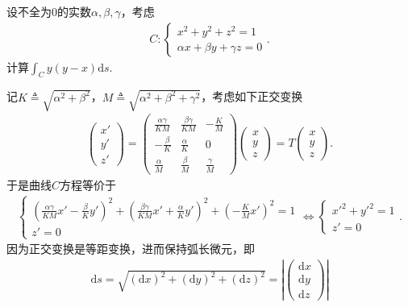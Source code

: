 \documentclass[../../main.tex]{subfiles}%
\begin{document}
\begin{example}
设不全为0的实数$\alpha,\beta,\gamma$，考虑
\begin{align*}
C:
\begin{cases}
x^2 + y^2 + z^2 = 1 \\
\alpha x + \beta y + \gamma z = 0
\end{cases}.
\end{align*}
计算$\int_C y(y - x)\mathrm{d}s$.
\end{example}
\begin{solution}

记$K\triangleq \sqrt{\alpha^2+\beta^2}$，$M\triangleq \sqrt{\alpha^2+\beta^2+\gamma^2}$，考虑如下正交变换
\begin{align*}
\begin{pmatrix}
x'\\
y'\\
z'
\end{pmatrix}
=
\begin{pmatrix}
\frac{\alpha\gamma}{KM} & \frac{\beta\gamma}{KM} & -\frac{K}{M}\\
-\frac{\beta}{K} & \frac{\alpha}{K} & 0\\
\frac{\alpha}{M} & \frac{\beta}{M} & \frac{\gamma}{M}
\end{pmatrix}
\begin{pmatrix}
x\\
y\\
z
\end{pmatrix}
= T
\begin{pmatrix}
x\\
y\\
z
\end{pmatrix}.
\end{align*}
于是曲线$C$方程等价于
\begin{align*}
\begin{cases}
\left( \frac{\alpha\gamma}{KM}x'-\frac{\beta}{K}y' \right)^2+\left( \frac{\beta\gamma}{KM}x'+\frac{\alpha}{K}y' \right)^2+\left( -\frac{K}{M}x' \right)^2=1\\
z' = 0
\end{cases}
\Longleftrightarrow
\begin{cases}
x'^2+y'^2=1\\
z' = 0
\end{cases}.
\end{align*}
因为正交变换是等距变换，进而保持弧长微元，即
\begin{align*}
\mathrm{d}s=\sqrt{(\mathrm{d}x)^2+(\mathrm{d}y)^2+(\mathrm{d}z)^2}
= \left| \begin{pmatrix} \mathrm{d}x\\ \mathrm{d}y\\ \mathrm{d}z \end{pmatrix} \right|

\end{align*}
\end{solution}
\end{document}
